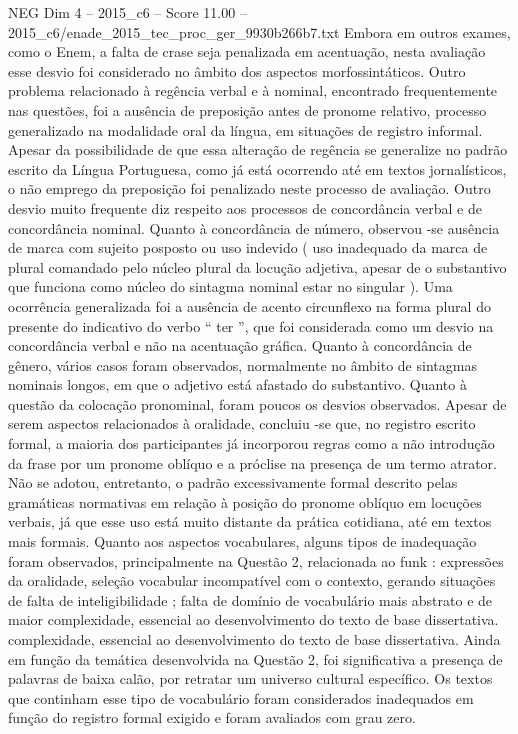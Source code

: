 \begin{textsample}{NEG Dim 4 – 2015\_c6 – Score 11.00 – 2015\_c6/enade\_2015\_tec\_proc\_ger\_9930b266b7.txt}
Embora em outros exames, como o Enem, a falta de crase seja penalizada em acentuação, nesta avaliação esse desvio foi considerado no âmbito dos aspectos morfossintáticos.
Outro problema relacionado à regência verbal e à nominal, encontrado frequentemente nas questões, foi a ausência de preposição antes de pronome relativo, processo generalizado na modalidade oral da língua, em situações de registro informal.
Apesar da possibilidade de que essa alteração de regência se generalize no padrão escrito da Língua Portuguesa, como já está ocorrendo até em textos jornalísticos, o não emprego da preposição foi penalizado neste processo de avaliação.
Outro desvio muito frequente diz respeito aos processos de concordância verbal e de concordância nominal.
Quanto à concordância de número, observou -se ausência de marca com sujeito posposto ou uso indevido ( uso inadequado da marca de plural comandado pelo núcleo plural da locução adjetiva, apesar de o substantivo que funciona como núcleo do sintagma nominal estar no singular ).
Uma ocorrência generalizada foi a ausência de acento circunflexo na forma plural do presente do indicativo do verbo “ ter ”, que foi considerada como um desvio na concordância verbal e não na acentuação gráfica.
Quanto à concordância de gênero, vários casos foram observados, normalmente no âmbito de sintagmas nominais longos, em que o adjetivo está afastado do substantivo.
Quanto à questão da colocação pronominal, foram poucos os desvios observados.
Apesar de serem aspectos relacionados à oralidade, concluiu -se que, no registro escrito formal, a maioria dos participantes já incorporou regras como a não introdução da frase por um pronome oblíquo e a próclise na presença de um termo atrator.
Não se adotou, entretanto, o padrão excessivamente formal descrito pelas gramáticas normativas em relação à posição do pronome oblíquo em locuções verbais, já que esse uso está muito distante da prática cotidiana, até em textos mais formais.
Quanto aos aspectos vocabulares, alguns tipos de inadequação foram observados, principalmente na Questão 2, relacionada ao funk : expressões da oralidade, seleção vocabular incompatível com o contexto, gerando situações de falta de inteligibilidade ; falta de domínio de vocabulário mais abstrato e de maior complexidade, essencial ao desenvolvimento do texto de base dissertativa. complexidade, essencial ao desenvolvimento do texto de base dissertativa.
Ainda em função da temática desenvolvida na Questão 2, foi significativa a presença de palavras de baixa calão, por retratar um universo cultural específico.
Os textos que continham esse tipo de vocabulário foram considerados inadequados em função do registro formal exigido e foram avaliados com grau zero.

\end{textsample}
